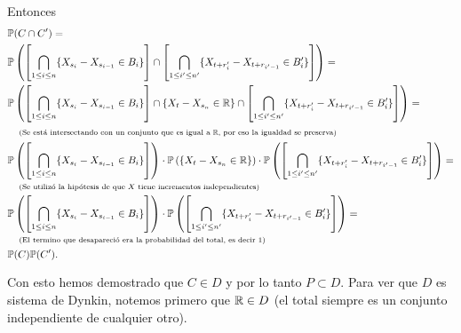 Entonces
\tiny               
\begin{align}
    &   \mathbb{P}(C \cap C')                                                                                                                                                                                                                                                   =   \\
    &   \mathbb{P}\left( \left[ \bigcap_{1 \leq i\leq n} \{ X_{s_i} - X_{s_{i-1}} \in B_i \} \right] \cap \left[ \bigcap_{1 \leq i' \leq n'} \{  X_{t + r_i'} - X_{t + r_{i' - 1}} \in B_i' \} \right] \right)                                                                  =   \\
    &   \mathbb{P}\left( \left[ \bigcap_{1 \leq i\leq n} \{ X_{s_i} - X_{s_{i-1}} \in B_i \} \right] \cap \{X_t - X_{s_n} \in \mathbb{R}\} \cap \left[ \bigcap_{1 \leq i' \leq n'} \{  X_{t + r_i'} - X_{t + r_{i' - 1}} \in B_i' \} \right] \right)                                    =   \\
    &   \;\;\;\;\mbox{{\scriptsize(Se está intersectando con un conjunto que es igual a $\mathbb{R}$, por eso la igualdad se preserva)}}                                                                                                                                                                \\
    &   \mathbb{P}\left( \left[ \bigcap_{1 \leq i\leq n} \{ X_{s_i} - X_{s_{i-1}} \in B_i \} \right] \right) \cdot \mathbb{P}\left( \{X_t - X_{s_n} \in \mathbb{R}\} \right) \cdot \mathbb{P}\left(\left[ \bigcap_{1 \leq i' \leq n'} \{  X_{t + r_i'} - X_{t + r_{i' - 1}} \in B_i' \} \right] \right) =   \\
    &   \;\;\;\;\mbox{{\scriptsize(Se utilizó la hipótesis de que $X$ tiene incrementos independientes)}}                                                                                                                                                                                       \\
    &   \mathbb{P}\left( \left[ \bigcap_{1 \leq i\leq n} \{ X_{s_i} - X_{s_{i-1}} \in B_i \} \right] \right) \cdot \mathbb{P}\left(\left[ \bigcap_{1 \leq i' \leq n'} \{  X_{t + r_i'} - X_{t + r_{i' - 1}} \in B_i' \} \right] \right)                                                 =   \\
    &   \;\;\;\;\mbox{{\scriptsize(El termino que desapareció era la probabilidad del total, es decir $1$)}}                                                                                                                                                                                    \\
    &   \mathbb{P}(C) \mathbb{P}(C').
\end{align}\pn
\normalsize

Con esto hemos demostrado que $C \in D$ y por lo tanto $P \subset D$. Para ver que $D$ es sistema de Dynkin, notemos primero que $\mathbb{R} \in D$ 
(el total siempre es un conjunto independiente de cualquier otro). 
